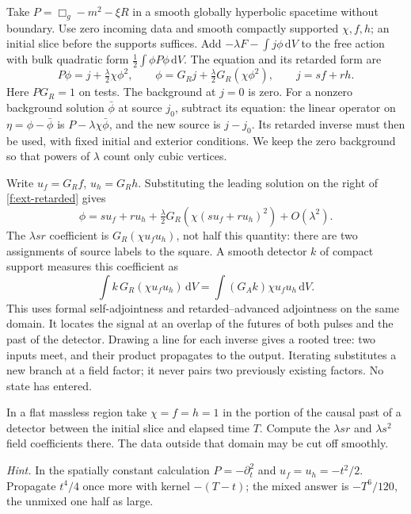 Take $P=\Box_g-m^2-\xi R$ in a smooth globally hyperbolic spacetime
without boundary.
Use zero incoming data and smooth compactly supported $\chi,f,h$; an
initial slice before the supports suffices. Add
$-\lambda F-\int j\phi\,\mathrm{d}V$ to the free action with bulk
quadratic form $\tfrac12\int\phi P\phi\,\mathrm{d}V$. The equation and its
retarded form are
\begin{equation}
 P\phi=j+\tfrac\lambda2\chi\phi^2,\qquad
 \phi=G_Rj+\tfrac\lambda2 G_R(\chi\phi^2),\qquad j=sf+rh .
 \label{f:ext-retarded}
\end{equation}
Here $PG_R=1$ on tests. The background at $j=0$ is zero. For a nonzero
background solution $\bar\phi$ at source $j_0$, subtract its equation:
the linear operator on $\eta=\phi-\bar\phi$ is $P-\lambda\chi\bar\phi$,
and the new source is $j-j_0$. Its retarded inverse must then be used,
with fixed initial and exterior conditions. We keep the zero background
so that powers of $\lambda$ count only cubic vertices.

Write $u_f=G_R f$, $u_h=G_R h$. Substituting the leading solution on the
right of \eqref{f:ext-retarded} gives
\[
 \phi=su_f+ru_h+\tfrac\lambda2 G_R\!\left(\chi(su_f+ru_h)^2\right)
          +O(\lambda^2).
\]
The $\lambda sr$ coefficient is $G_R(\chi u_f u_h)$, not half this
quantity: there are two assignments of source labels to the square. A
smooth detector $k$ of compact support measures this coefficient as
\begin{equation}
 \int k\,G_R(\chi u_f u_h)\,\mathrm{d}V
       =\int (G_A k)\chi u_f u_h\,\mathrm{d}V .
 \label{f:ext-tree}
\end{equation}
This uses formal self-adjointness and retarded--advanced adjointness on
the same domain. It locates the signal at an overlap of the futures of
both pulses and the past of the detector. Drawing a line for each inverse
gives a rooted tree: two inputs meet, and their product propagates to the
output. Iterating substitutes a new branch at a field factor; it never
pairs two previously existing factors. No state has entered.

\begin{exercise}
In a flat massless region take $\chi=f=h=1$ in the portion of the causal
past of a detector between the initial slice and elapsed time $T$. Compute
the $\lambda sr$ and $\lambda s^2$ field coefficients there. The data
outside that domain may be cut off smoothly.
\end{exercise}
\noindent\emph{Hint.} In the spatially constant calculation $P=-\partial_t^2$
and $u_f=u_h=-t^2/2$. Propagate $t^4/4$ once more with kernel $-(T-t)$;
the mixed answer is $-T^6/120$, the unmixed one half as large.

